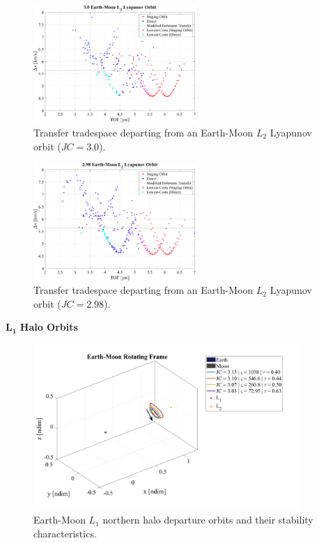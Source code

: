 \begin{figure}[ht]
    \centering
    \includegraphics[width=0.55\textwidth]{figures/TradeSpace_L2Lyapunov_3_00.pdf}
    \caption{Transfer tradespace departing from an Earth-Moon $L_{2}$ Lyapunov orbit ($JC=3.0$).}
\end{figure}

\begin{figure}[ht]
    \centering
    \includegraphics[width=0.55\textwidth]{figures/TradeSpace_L2Lyapunov_2_98.pdf}
    \caption{Transfer tradespace departing from an Earth-Moon $L_{2}$ Lyapunov orbit ($JC=2.98$).}
\end{figure}
\clearpage

$\pmb{L_{1}}$ \textbf{Halo Orbits}
\begin{figure}[ht]
    \centering
    \includegraphics[width=0.9\textwidth]{figures/L1HaloDepartureOrbits.pdf}
    \caption{Earth-Moon $L_{1}$ northern halo departure orbits and their stability characteristics.}
\end{figure}

